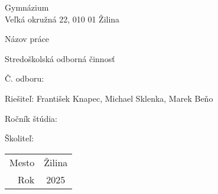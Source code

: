 \documentclass[12pt]{article}
\begin{document}
\begin{titlepage}
    \setlength{\parindent}{0pt}

    \begin{center}
        Gymnázium \\
        Veľká okružná 22, 010 01 Žilina

        \vspace{7cm}
        \Huge Názov práce

        \vspace{1.13cm}
        \Large Stredoškolská odborná činnosť

        \vspace{2.12cm}
        \normalsize Č. odboru:
    \end{center}

    \vfill

    \begin{minipage}{0.75\textwidth}
        Riešiteľ: František Knapec, Michael Sklenka, Marek Beňo \par
        Ročník štúdia: \par
        Školiteľ:
    \end{minipage}
    \hfill
    \begin{minipage}{0.2\textwidth}
        \hfil %
        \begin{tabular}{r@{: }c}
            Mesto & Žilina \\
            Rok   & 2025
        \end{tabular}
    \end{minipage}
\end{titlepage}
\end{document}
